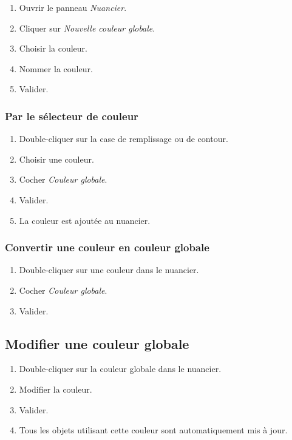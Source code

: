 \begin{enumerate}
    \item Ouvrir le panneau \emph{Nuancier}.
    \item Cliquer sur \emph{Nouvelle couleur globale}.
    \item Choisir la couleur.
    \item Nommer la couleur.
    \item Valider.
\end{enumerate}

\subsubsection{Par le sélecteur de couleur}

\begin{enumerate}
    \item Double-cliquer sur la case de remplissage ou de contour.
    \item Choisir une couleur.
    \item Cocher \emph{Couleur globale}.
    \item Valider.
    \item La couleur est ajoutée au nuancier.
\end{enumerate}

\subsubsection{Convertir une couleur en couleur globale}

\begin{enumerate}
    \item Double-cliquer sur une couleur dans le nuancier.
    \item Cocher \emph{Couleur globale}.
    \item Valider.
\end{enumerate}

\subsection{Modifier une couleur globale}

\begin{enumerate}
    \item Double-cliquer sur la couleur globale dans le nuancier.
    \item Modifier la couleur.
    \item Valider.
    \item Tous les objets utilisant cette couleur sont automatiquement mis à jour.
\end{enumerate}

